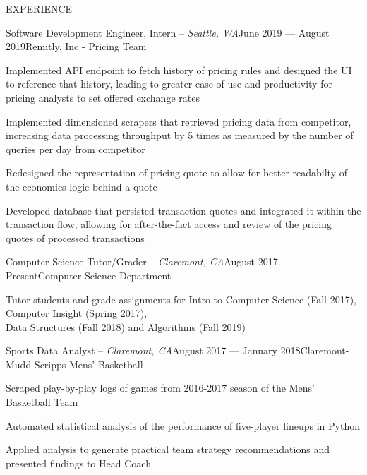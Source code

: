 \documentclass{resume} %
\begin{document}
\begin{rSection}{EXPERIENCE}
\begin{rSubsection}{Software
Development Engineer, Intern -- {\it Seattle, WA}}{June 2019 --- August 2019}{Remitly, Inc - Pricing Team}

\item Implemented API endpoint to fetch history of pricing rules and designed the UI to reference that history, leading to greater ease-of-use and productivity for pricing analysts to set offered exchange rates
\item Implemented dimensioned scrapers that retrieved pricing data from competitor, increasing data processing throughput by 5 times as measured by the number of queries per day from competitor
\item Redesigned the representation of pricing quote to allow for better readabilty of the economics logic behind a quote
\item Developed database that persisted transaction quotes and integrated it within the transaction flow, allowing for after-the-fact access and review of the pricing quotes of processed transactions

\end{rSubsection}
\begin{rSubsection}{Computer Science Tutor/Grader -- {\it Claremont, CA}}{August 2017 --- Present}{Computer Science Department}

\item Tutor students and grade assignments for Intro to Computer Science (Fall 2017), Computer Insight (Spring 2017),\\Data Structures (Fall 2018) and Algorithms (Fall 2019)
\end{rSubsection}

\begin{rSubsection}{Sports Data Analyst -- {\it Claremont, CA}}{August 2017 --- January 2018}{Claremont-Mudd-Scripps Mens' Basketball}

\item Scraped play-by-play logs of games from 2016-2017 season of the Mens' Basketball Team
\item Automated statistical analysis of the performance of five-player lineups in Python
\item Applied analysis to generate practical team strategy recommendations and presented findings to Head Coach

\end{rSubsection}
\end{rSection}
\end{document}
